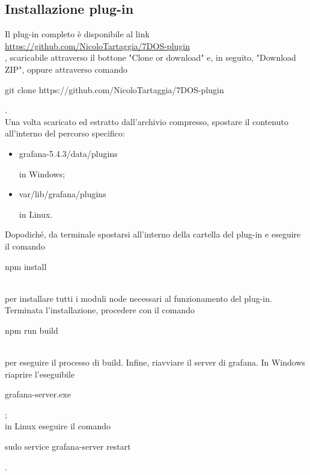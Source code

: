 \subsection{Installazione plug-in}
Il plug-in completo è disponibile al link \\[0.2cm]
\hspace*{10mm}\url{https://github.com/NicoloTartaggia/7DOS-plugin}\\[0.2cm], scaricabile attraverso il bottone "Clone or download" e, in seguito, "Download ZIP", oppure attraverso comando \\[0.2cm]
\hspace*{10mm}\begin{ttfamily}git clone https://github.com/NicoloTartaggia/7DOS-plugin\end{ttfamily}.\\[0.2cm]Una volta scaricato ed estratto dall'archivio compresso, spostare il contenuto all'interno del percorso specifico: 
\begin{itemize}
	\item{\begin{ttfamily}grafana-5.4.3/data/plugins\end{ttfamily}} in Windows; \item{\begin{ttfamily}var/lib/grafana/plugins\end{ttfamily} in Linux.}
\end{itemize}
Dopodiché, da terminale spostarsi all'interno della cartella del plug-in e eseguire il comando \\[0.2cm]
\hspace*{10mm}\begin{ttfamily}npm install\end{ttfamily}\\[0.2cm] per installare tutti i moduli node necessari al funzionamento del plug-in. Terminata l'installazione, procedere con il comando \\[0.2cm]
\hspace*{10mm}\begin{ttfamily}npm run build\end{ttfamily}\\[0.2cm] per eseguire il processo di build. 
Infine, riavviare il server di grafana. In Windows riaprire l'eseguibile \\[0.2cm]
\hspace*{10mm}\begin{ttfamily}grafana-server.exe\end{ttfamily};\\[0.2cm] in Linux eseguire il comando \\[0.2cm]
\hspace*{10mm}\begin{ttfamily}sudo service grafana-server restart\end{ttfamily}.

